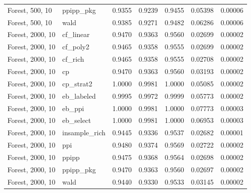\begin{longtable}{llrrrrr}
Forest, 500, 10 & ppipp\_pkg & 0.9355 & 0.9239 & 0.9455 & 0.05398 & 0.00006 \\
Forest, 500, 10 & wald & 0.9385 & 0.9271 & 0.9482 & 0.06286 & 0.00006 \\
Forest, 2000, 10 & cf\_linear & 0.9470 & 0.9363 & 0.9560 & 0.02699 & 0.00002 \\
Forest, 2000, 10 & cf\_poly2 & 0.9465 & 0.9358 & 0.9555 & 0.02699 & 0.00002 \\
Forest, 2000, 10 & cf\_rich & 0.9465 & 0.9358 & 0.9555 & 0.02708 & 0.00002 \\
Forest, 2000, 10 & cp & 0.9470 & 0.9363 & 0.9560 & 0.03193 & 0.00002 \\
Forest, 2000, 10 & cp\_strat2 & 1.0000 & 0.9981 & 1.0000 & 0.05085 & 0.00002 \\
Forest, 2000, 10 & eb\_labeled & 0.9995 & 0.9972 & 0.9999 & 0.05773 & 0.00002 \\
Forest, 2000, 10 & eb\_ppi & 1.0000 & 0.9981 & 1.0000 & 0.07773 & 0.00003 \\
Forest, 2000, 10 & eb\_select & 1.0000 & 0.9981 & 1.0000 & 0.06953 & 0.00003 \\
Forest, 2000, 10 & insample\_rich & 0.9445 & 0.9336 & 0.9537 & 0.02682 & 0.00001 \\
Forest, 2000, 10 & ppi & 0.9480 & 0.9374 & 0.9569 & 0.02722 & 0.00002 \\
Forest, 2000, 10 & ppipp & 0.9475 & 0.9368 & 0.9564 & 0.02698 & 0.00002 \\
Forest, 2000, 10 & ppipp\_pkg & 0.9470 & 0.9363 & 0.9560 & 0.02697 & 0.00002 \\
Forest, 2000, 10 & wald & 0.9440 & 0.9330 & 0.9533 & 0.03145 & 0.00002 \\
\bottomrule
\end{longtable}
